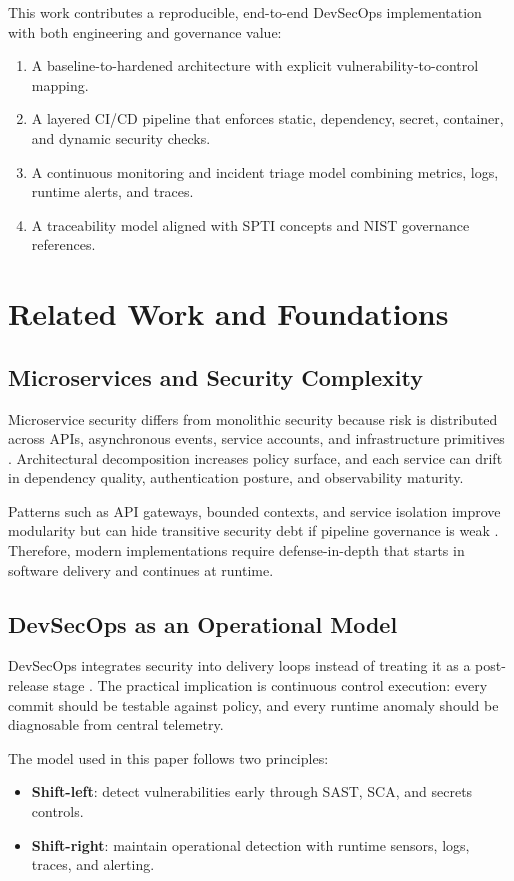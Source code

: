 \documentclass[conference]{IEEEtran}
\begin{document}
This work contributes a reproducible, end-to-end DevSecOps implementation with both engineering and governance value:
\begin{enumerate}
\item A baseline-to-hardened architecture with explicit vulnerability-to-control mapping.
\item A layered CI/CD pipeline that enforces static, dependency, secret, container, and dynamic security checks.
\item A continuous monitoring and incident triage model combining metrics, logs, runtime alerts, and traces.
\item A traceability model aligned with SPTI concepts and NIST governance references.
\end{enumerate}

\section{Related Work and Foundations}
\subsection{Microservices and Security Complexity}
Microservice security differs from monolithic security because risk is distributed across APIs, asynchronous events, service accounts, and infrastructure primitives \cite{newman2015,bass2021}. Architectural decomposition increases policy surface, and each service can drift in dependency quality, authentication posture, and observability maturity.

Patterns such as API gateways, bounded contexts, and service isolation improve modularity but can hide transitive security debt if pipeline governance is weak \cite{richardson2018}. Therefore, modern implementations require defense-in-depth that starts in software delivery and continues at runtime.

\subsection{DevSecOps as an Operational Model}
DevSecOps integrates security into delivery loops instead of treating it as a post-release stage \cite{kim2021,devsecopsnist}. The practical implication is continuous control execution: every commit should be testable against policy, and every runtime anomaly should be diagnosable from central telemetry.

The model used in this paper follows two principles:
\begin{itemize}
\item \textbf{Shift-left}: detect vulnerabilities early through SAST, SCA, and secrets controls.
\item \textbf{Shift-right}: maintain operational detection with runtime sensors, logs, traces, and alerting.
\end{itemize}
\end{document}
